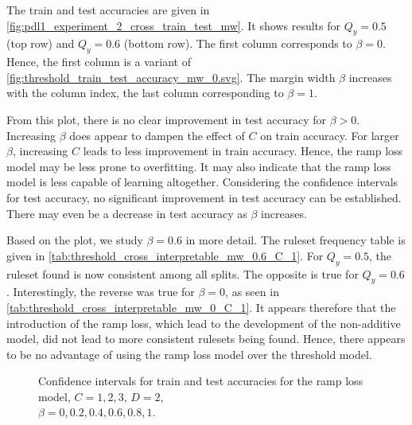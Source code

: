 The train and test accuracies are given in \autoref{fig:pdl1_experiment_2_cross_train_test_mw}.
It shows results for $Q_y=0.5$ (top row) and $Q_y=0.6$ (bottom row).
The first column corresponds to $\beta=0$.
Hence, the first column is a variant of \autoref{fig:threshold_train_test_accuracy_mw_0.svg}.
The margin width $\beta$ increases with the column index, the last column corresponding to $\beta=1$.

From this plot, there is no clear improvement in test accuracy for $\beta>0$.
Increasing $\beta$ does appear to dampen the effect of $C$ on train accuracy.
For larger $\beta$, increasing $C$ leads to less improvement in train accuracy.
Hence, the ramp loss model may be less prone to overfitting.
It may also indicate that the ramp loss model is less capable of learning altogether.
Considering the confidence intervals for test accuracy,
no significant improvement in test accuracy can be established.
There may even be a decrease in test accuracy as $\beta$ increases.

Based on the plot, we study $\beta=0.6$ in more detail.
The ruleset frequency table is given in \autoref{tab:threshold_cross_interpretable_mw_0.6_C_1}.
For $Q_y=0.5$, the ruleset found is now consistent among all splits.
The opposite is true for $Q_y=0.6$.
Interestingly, the reverse was true for $\beta=0$, as seen in \autoref{tab:threshold_cross_interpretable_mw_0_C_1}.
It appears therefore that the introduction of the ramp loss,
which lead to the development of the non-additive model, did not lead to more consistent rulesets being found.
Hence, there appears to be no advantage of using the ramp loss model over the threshold model.

\clearpage

\begin{landscape}
    \vspace*{\fill}
    \begin{figure}[h]
        
        \caption{Confidence intervals for train and test accuracies for the ramp loss model, $C=1,2,3$, $D=2$, \\ $\beta=0,0.2,0.4,0.6,0.8,1$.}
        \label{fig:pdl1_experiment_2_cross_train_test_mw}
    \end{figure}
    \vspace*{\fill}
\end{landscape}


\begin{table}[h]
    \centering
    
    \caption{}
    \label{tab:threshold_cross_interpretable_mw_0.6_C_1}
\end{table}